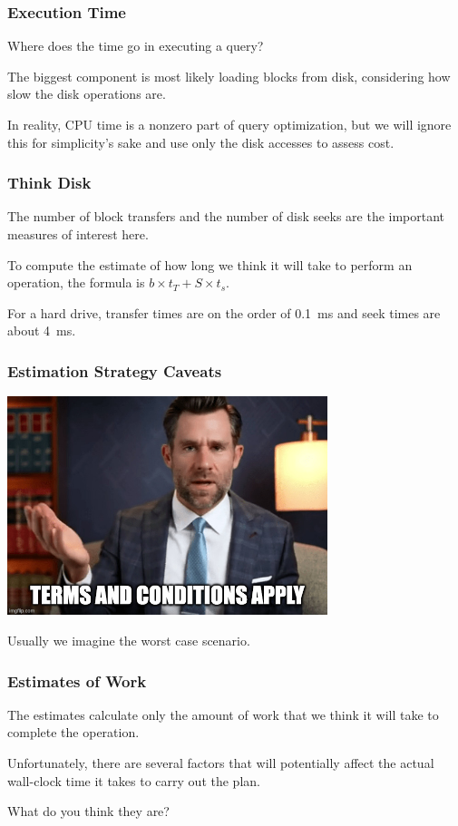 \begin{frame}
\frametitle{Execution Time}

Where does the time go in executing a query? 

The biggest component is most likely loading blocks from disk, considering how slow the disk operations are. 

In reality, CPU time is a nonzero part of query optimization, but we will ignore this for simplicity's sake and use only the disk accesses to assess cost.

\end{frame}

\begin{frame}
\frametitle{Think Disk}

The number of block transfers and the number of disk seeks are the important measures of interest here.
 
To compute the estimate of how long we think it will take to perform an operation, the formula is $b \times t_{T} + S \times t_{s}$. 

For a hard drive, transfer times are on the order of 0.1~ms and seek times are about 4~ms.

\end{frame}

\begin{frame}
\frametitle{Estimation Strategy Caveats}

\begin{center}
	\includegraphics[width=0.7\textwidth]{images/legaleagle.jpg}
\end{center}

Usually we imagine the worst case scenario.

\end{frame}



\begin{frame}
\frametitle{Estimates of Work}

The estimates calculate only the amount of work that we think it will take to complete the operation. 

Unfortunately, there are several factors that will potentially affect the actual wall-clock time it takes to carry out the plan. 

What do you think they are?


\end{frame}



